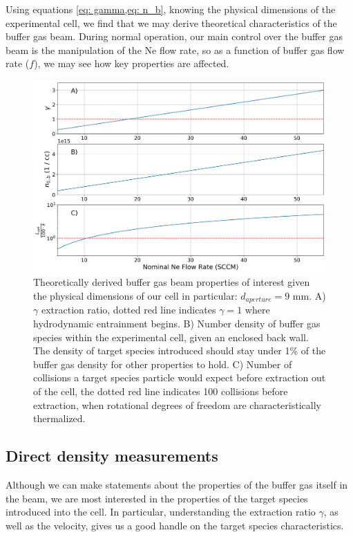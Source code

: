 Using equations \cref{eq: gamma,eq: n_b}, knowing the physical dimensions of the experimental cell, we find that we may derive theoretical characteristics of the buffer gas beam. During normal operation, our main control over the buffer gas beam is the manipulation of the Ne flow rate, so as a function of buffer gas flow rate ($f$), we may see how key properties are affected.

\begin{figure}[H]
	\centering
	\includegraphics[width=1\textwidth]{images/CBGB_flow_characteristics.png}
	\caption{Theoretically derived buffer gas beam properties of interest given the physical dimensions of our cell in particular: $d_{aperture} = 9$ mm. A) $\gamma$ extraction ratio, dotted red line indicates $\gamma = 1$ where hydrodynamic entrainment begins. B) Number density of buffer gas species within the experimental cell, given an enclosed back wall. The density of target species introduced should stay under 1\% of the buffer gas density for other properties to hold. C) Number of collisions a target species particle would expect before extraction out of the cell, the dotted red line indicates 100 collisions before extraction, when rotational degrees of freedom are characteristically thermalized.}
	\label{fig: buffer_gas_flow}
\end{figure}

\subsection{Direct density measurements}

Although we can make statements about the properties of the buffer gas itself in the beam, we are most interested in the properties of the target species introduced into the cell. In particular, understanding the extraction ratio $\gamma$, as well as the velocity, gives us a good handle on the target species characteristics.

